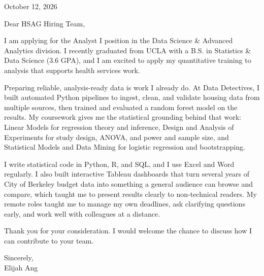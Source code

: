 \documentclass[11pt,letterpaper]{article}
\begin{document}


\vspace{12pt}

October 12, 2026

Dear HSAG Hiring Team,

I am applying for the Analyst I position in the Data Science \& Advanced Analytics division. I recently graduated from UCLA with a B.S. in Statistics \& Data Science (3.6 GPA), and I am excited to apply my quantitative training to analysis that supports health services work.

Preparing reliable, analysis-ready data is work I already do. At Data Detectives, I built automated Python pipelines to ingest, clean, and validate housing data from multiple sources, then trained and evaluated a random forest model on the results. My coursework gives me the statistical grounding behind that work: Linear Models for regression theory and inference, Design and Analysis of Experiments for study design, ANOVA, and power and sample size, and Statistical Models and Data Mining for logistic regression and bootstrapping.

I write statistical code in Python, R, and SQL, and I use Excel and Word regularly. I also built interactive Tableau dashboards that turn several years of City of Berkeley budget data into something a general audience can browse and compare, which taught me to present results clearly to non-technical readers. My remote roles taught me to manage my own deadlines, ask clarifying questions early, and work well with colleagues at a distance.

Thank you for your consideration. I would welcome the chance to discuss how I can contribute to your team.

Sincerely,\\
Elijah Ang
\end{document}
